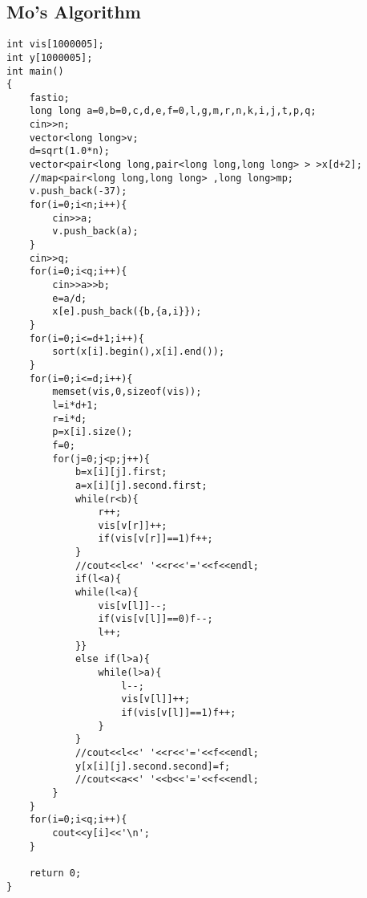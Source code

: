 \documentclass[10pt,a4paper,onesided]{article}
\begin{document}
\begin{multicols*}{3}
\subsection{Mo's Algorithm}
\begin{lstlisting}
int vis[1000005];
int y[1000005];
int main()
{
    fastio;
    long long a=0,b=0,c,d,e,f=0,l,g,m,r,n,k,i,j,t,p,q;
    cin>>n;
    vector<long long>v;
    d=sqrt(1.0*n);
    vector<pair<long long,pair<long long,long long> > >x[d+2];
    //map<pair<long long,long long> ,long long>mp;
    v.push_back(-37);
    for(i=0;i<n;i++){
        cin>>a;
        v.push_back(a);
    }
    cin>>q;
    for(i=0;i<q;i++){
        cin>>a>>b;
        e=a/d;
        x[e].push_back({b,{a,i}});
    }
    for(i=0;i<=d+1;i++){
        sort(x[i].begin(),x[i].end());
    }
    for(i=0;i<=d;i++){
        memset(vis,0,sizeof(vis));
        l=i*d+1;
        r=i*d;
        p=x[i].size();
        f=0;
        for(j=0;j<p;j++){
            b=x[i][j].first;
            a=x[i][j].second.first;
            while(r<b){
                r++;
                vis[v[r]]++;
                if(vis[v[r]]==1)f++;
            }
            //cout<<l<<' '<<r<<'='<<f<<endl;
            if(l<a){
            while(l<a){
                vis[v[l]]--;
                if(vis[v[l]]==0)f--;
                l++;
            }}
            else if(l>a){
                while(l>a){
                    l--;
                    vis[v[l]]++;
                    if(vis[v[l]]==1)f++;
                }
            }
            //cout<<l<<' '<<r<<'='<<f<<endl;
            y[x[i][j].second.second]=f;
            //cout<<a<<' '<<b<<'='<<f<<endl;
        }
    }
    for(i=0;i<q;i++){
        cout<<y[i]<<'\n';
    }

    return 0;
}
\end{lstlisting}

\end{multicols*}
\end{document}
